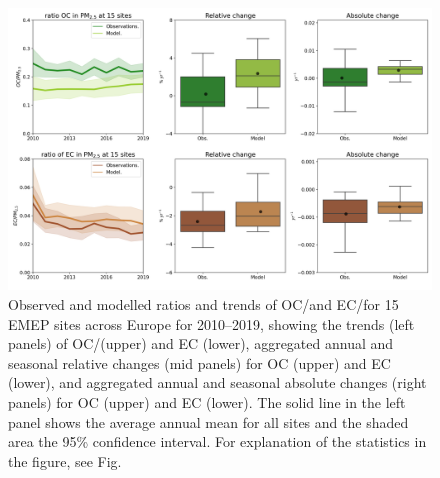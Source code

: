 \begin{figure}
\includegraphics[width=16cm]{FIGS_TRENDS/ECOC_ratio_trends.png}
 \caption{Observed and modelled ratios and trends of OC/\pmfine and EC/\pmfine for
  15 EMEP sites across Europe for 2010--2019, showing the trends
  (left panels) of OC/\pmfine (upper) and EC (lower), aggregated annual and
  seasonal relative changes (mid panels) for OC (upper) and EC (lower),
  and aggregated annual and seasonal absolute changes (right panels)
  for OC (upper) and EC (lower). The solid line in the left panel shows
  the average annual mean for all sites and the shaded area the 95\%
  confidence interval. For explanation of the statistics in the figure,
  see Fig.~\label{fig:KEX3}
 }
\end{figure}

